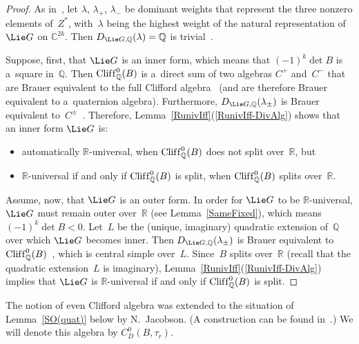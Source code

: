\documentclass[pdftex]{sigma}
\DeclareMathOperator{\Cliff}{Clif\/f}
\numberwithin{equation}{section}
\begin{document}
\begin{proof}
As in~\cite[\S~27B, type~$D_n$, p.~379]{KnusEtAl-BookOfInvols}, let $\lambda$, $\lambda_+$, $\lambda_-$ be dominant weights
that represent the three nonzero elements of~$Z^*$, with~$\lambda$ being the highest weight of the natural
representation of~$\Lie G$ on $\mathbb{C}^{2k}$.
Then $D_{\Lie G, \mathbb{Q}}(\lambda) = \mathbb{Q}$ is trivial~\cite[p.~379]{KnusEtAl-BookOfInvols}.

Suppose, f\/irst, that $\Lie G$ is an inner form, which means that $(-1)^k \det B$ is a~square in~$\mathbb{Q}$.
Then $\Cliff^0_\mathbb{Q}(B)$ is a~direct sum of two algebras $C^+$ and~$C^-$ that are Brauer equivalent to the full
Clif\/ford algebra~\cite[Theorem~2.5(3), p.~110]{Lam-IntroQuadForms} (and are therefore Brauer equivalent to a~quaternion
algebra).
Furthermore, $D_{\Lie G, \mathbb{Q}}(\lambda_{\pm})$ is Brauer equivalent
to~$C^\pm$~\cite[p.~379]{KnusEtAl-BookOfInvols}.
Therefore, Lemma~\ref{RunivIff}(\ref{RunivIff-DivAlg}) shows that an inner form $\Lie G$ is:
\begin{itemize}\itemsep=0pt
\item automatically $\mathbb{R}$-universal, when $\Cliff^0_\mathbb{Q}(B)$ does not split over~$\mathbb{R}$, but
\item $\mathbb{R}$-universal if and only if $\Cliff^0_\mathbb{Q}(B)$ is split, when $\Cliff^0_\mathbb{Q}(B)$ splits
over~$\mathbb{R}$.
\end{itemize}

Assume, now, that $\Lie G$ is an outer form.
In order for $\Lie G$ to be $\mathbb{R}$-universal, $\Lie G$ must remain outer over~$\mathbb{R}$ (see Lemma~\ref{SameFixed}),
which means $(-1)^k \det B < 0$.
Let~$L$ be the (unique, imaginary) quadratic extension of~$\mathbb{Q}$ over which $\Lie G$ becomes inner.
Then $D_{\Lie G, \mathbb{Q}}(\lambda_{\pm})$ is Brauer equivalent to
$\Cliff^0_\mathbb{Q}(B)$~\cite[p.~379]{KnusEtAl-BookOfInvols}, which is central simple over~$L$.
Since~$B$ splits over~$\mathbb{R}$ (recall that the quadratic extension~$L$ is
imaginary), Lemma~\ref{RunivIff}(\ref{RunivIff-DivAlg}) implies that $\Lie G$ is $\mathbb{R}$-universal if and only if
$\Cliff^0_\mathbb{Q}(B)$ is split.
\end{proof}

\begin{notation}
The notion of even Clif\/ford algebra was extended to the situation of Lem\-ma~\ref{SO(quat)} below by N.~Jacobson.
(A construction can be found in~\cite[\S~8B, pp.~91ff]{KnusEtAl-BookOfInvols}.) We will denote this algebra by $C^0_D(B,
\tau_r)$.
\end{notation}
\end{document}
